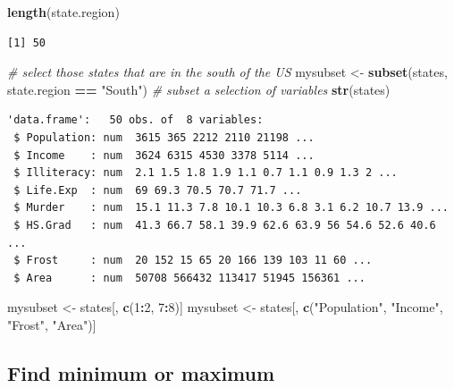 \documentclass[
]{book}
\newenvironment{Shaded}{\begin{snugshade}}{\end{snugshade}}
\newcommand{\CommentTok}[1]{\textcolor[rgb]{0.56,0.35,0.01}{\textit{#1}}}
\newcommand{\DecValTok}[1]{\textcolor[rgb]{0.00,0.00,0.81}{#1}}
\newcommand{\KeywordTok}[1]{\textcolor[rgb]{0.13,0.29,0.53}{\textbf{#1}}}
\newcommand{\NormalTok}[1]{#1}
\newcommand{\OperatorTok}[1]{\textcolor[rgb]{0.81,0.36,0.00}{\textbf{#1}}}
\newcommand{\StringTok}[1]{\textcolor[rgb]{0.31,0.60,0.02}{#1}}
\begin{document}
\begin{Shaded}
\begin{Highlighting}[]
\KeywordTok{length}\NormalTok{(state.region)}
\end{Highlighting}
\end{Shaded}

\begin{verbatim}
[1] 50
\end{verbatim}

\begin{Shaded}
\begin{Highlighting}[]
\CommentTok{# select those states that are in the south of the US }
\NormalTok{mysubset <-}\StringTok{ }\KeywordTok{subset}\NormalTok{(states, state.region }\OperatorTok{==}\StringTok{ "South"}\NormalTok{)}
\CommentTok{# subset a selection of variables}
\KeywordTok{str}\NormalTok{(states)}
\end{Highlighting}
\end{Shaded}

\begin{verbatim}
'data.frame':	50 obs. of  8 variables:
 $ Population: num  3615 365 2212 2110 21198 ...
 $ Income    : num  3624 6315 4530 3378 5114 ...
 $ Illiteracy: num  2.1 1.5 1.8 1.9 1.1 0.7 1.1 0.9 1.3 2 ...
 $ Life.Exp  : num  69 69.3 70.5 70.7 71.7 ...
 $ Murder    : num  15.1 11.3 7.8 10.1 10.3 6.8 3.1 6.2 10.7 13.9 ...
 $ HS.Grad   : num  41.3 66.7 58.1 39.9 62.6 63.9 56 54.6 52.6 40.6 ...
 $ Frost     : num  20 152 15 65 20 166 139 103 11 60 ...
 $ Area      : num  50708 566432 113417 51945 156361 ...
\end{verbatim}

\begin{Shaded}
\begin{Highlighting}[]
\NormalTok{mysubset <-}\StringTok{ }\NormalTok{states[, }\KeywordTok{c}\NormalTok{(}\DecValTok{1}\OperatorTok{:}\DecValTok{2}\NormalTok{, }\DecValTok{7}\OperatorTok{:}\DecValTok{8}\NormalTok{)]}
\NormalTok{mysubset <-}\StringTok{ }\NormalTok{states[, }\KeywordTok{c}\NormalTok{(}\StringTok{"Population"}\NormalTok{, }\StringTok{"Income"}\NormalTok{, }\StringTok{"Frost"}\NormalTok{, }\StringTok{"Area"}\NormalTok{)]}
\end{Highlighting}
\end{Shaded}

\hypertarget{find-minimum-or-maximum}{%
\subsection{Find minimum or maximum}\label{find-minimum-or-maximum}}
\end{document}
